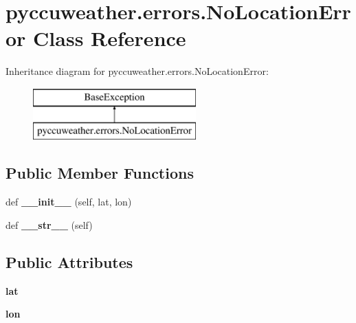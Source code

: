 \hypertarget{classpyccuweather_1_1errors_1_1_no_location_error}{}\section{pyccuweather.\+errors.\+No\+Location\+Error Class Reference}
\label{classpyccuweather_1_1errors_1_1_no_location_error}
Inheritance diagram for pyccuweather.\+errors.\+No\+Location\+Error\+:\begin{figure}[H]
\begin{center}
\leavevmode
\includegraphics[height=2.000000cm]{classpyccuweather_1_1errors_1_1_no_location_error}
\end{center}
\end{figure}
\subsection*{Public Member Functions}
\begin{DoxyCompactItemize}
\item 
\hypertarget{classpyccuweather_1_1errors_1_1_no_location_error_a85c98a0aa027190c5b7ec7100565f8e5}{}def {\bfseries \+\_\+\+\_\+init\+\_\+\+\_\+} (self, lat, lon)\label{classpyccuweather_1_1errors_1_1_no_location_error_a85c98a0aa027190c5b7ec7100565f8e5}

\item 
\hypertarget{classpyccuweather_1_1errors_1_1_no_location_error_adbfbbfb0c27f22f536c0bd2cf1e8a9a0}{}def {\bfseries \+\_\+\+\_\+str\+\_\+\+\_\+} (self)\label{classpyccuweather_1_1errors_1_1_no_location_error_adbfbbfb0c27f22f536c0bd2cf1e8a9a0}

\end{DoxyCompactItemize}
\subsection*{Public Attributes}
\begin{DoxyCompactItemize}
\item 
\hypertarget{classpyccuweather_1_1errors_1_1_no_location_error_a62c196dbabf819f8ac23d9219091f64c}{}{\bfseries lat}\label{classpyccuweather_1_1errors_1_1_no_location_error_a62c196dbabf819f8ac23d9219091f64c}

\item 
\hypertarget{classpyccuweather_1_1errors_1_1_no_location_error_a4ebcd15e499e59fa5f691d55aa4845fa}{}{\bfseries lon}\label{classpyccuweather_1_1errors_1_1_no_location_error_a4ebcd15e499e59fa5f691d55aa4845fa}

\end{DoxyCompactItemize}


